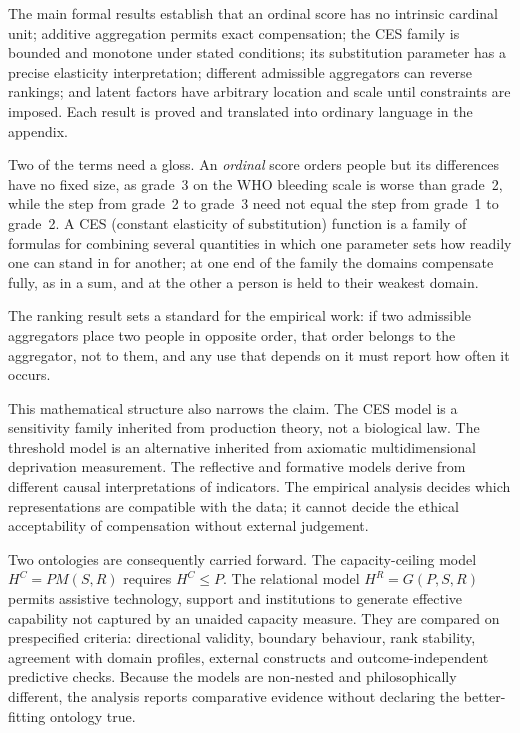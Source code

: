 The main formal results establish that an ordinal score has no intrinsic
cardinal unit; additive aggregation permits exact compensation; the CES \citep{arrow_chenery_1961} family
is bounded and monotone under stated conditions; its substitution parameter has
a precise elasticity interpretation; different admissible aggregators can
reverse rankings; and latent factors have arbitrary location and scale until
constraints are imposed. Each result is proved and translated into ordinary
language in the appendix.

Two of the terms need a gloss. An \emph{ordinal} score orders people but its differences have no fixed size, as grade~3 on the WHO bleeding scale is worse than grade~2, while the step from grade~2 to grade~3 need not equal the step from grade~1 to grade~2. A CES (constant elasticity of substitution) function is a family of formulas for combining several quantities in which one parameter sets how readily one can stand in for another; at one end of the family the domains compensate fully, as in a sum, and at the other a person is held to their weakest domain.

The ranking result sets a standard for the empirical work: if two admissible
aggregators place two people in opposite order, that order belongs to the
aggregator, not to them, and any use that depends on it must report how often
it occurs.

This mathematical structure also narrows the claim. The CES model is a
sensitivity family inherited from production theory, not a biological law.
The threshold model is an alternative inherited from axiomatic
multidimensional deprivation measurement. The reflective and formative models
derive from different causal interpretations of indicators. The empirical
analysis decides which representations are compatible with the data; it cannot
decide the ethical acceptability of compensation without external judgement.

Two ontologies are consequently carried forward. The capacity-ceiling model
$H^C=P M(S,R)$ requires $H^C\le P$. The relational model $H^R=G(P,S,R)$ permits
assistive technology, support and institutions to generate effective capability
not captured by an unaided capacity measure. They are compared on prespecified
criteria: directional validity, boundary behaviour, rank stability, agreement
with domain profiles, external constructs and outcome-independent predictive
checks. Because the models are non-nested and philosophically different, the
analysis reports comparative evidence without declaring the better-fitting
ontology true.

